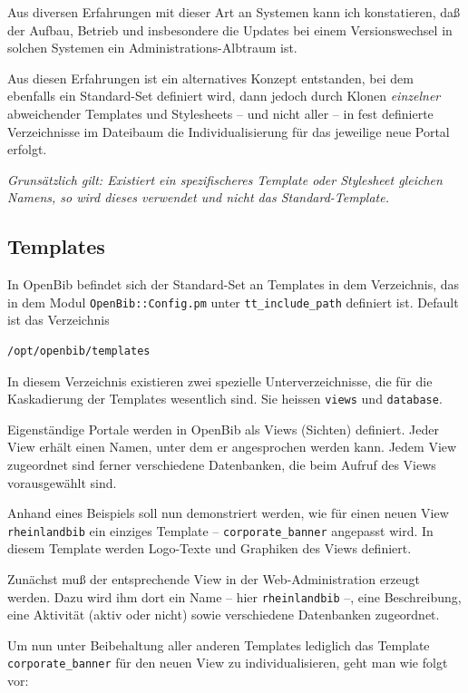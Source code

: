 \documentclass[11pt, twoside, a4paper, BCOR8mm, DIV12, bibtotoc,idxtotoc]{scrbook}
\begin{document}
Aus diversen Erfahrungen mit dieser Art an Systemen kann ich
konstatieren, daß der Aufbau, Betrieb und insbesondere die Updates bei
einem Versionswechsel in solchen Systemen ein Adminis\-tra\-tions-Albtraum
ist.

Aus diesen Erfahrungen ist ein alternatives Konzept entstanden, bei
dem ebenfalls ein Standard-Set definiert wird, dann jedoch durch Klonen
\emph{einzelner} abweichender Templates und Stylesheets -- und nicht
aller -- in fest definierte Verzeichnisse im Dateibaum die
Individualisierung für das jeweilige neue Portal erfolgt.

\emph{Grunsätzlich gilt: Existiert ein spezifischeres Template oder
Stylesheet gleichen Namens, so wird dieses verwendet und nicht das
Standard-Template.}


\subsection{Templates}

In OpenBib befindet sich der Standard-Set an Templates in dem
Verzeichnis, das in dem Modul \texttt{OpenBib::Config.pm} unter
\texttt{tt\_include\_path} definiert ist. Default ist das Verzeichnis
\begin{verbatim}
/opt/openbib/templates
\end{verbatim} 

In diesem Verzeichnis existieren zwei
spezielle Unterverzeichnisse, die für die Kaskadierung der Templates
wesentlich sind. Sie heissen \texttt{views} und \texttt{database}.

Eigenständige Portale werden in OpenBib als Views (Sichten)
definiert. Jeder View erhält einen Namen, unter dem er angesprochen
werden kann. Jedem View zugeordnet sind ferner verschiedene
Datenbanken, die beim Aufruf des Views vorausgewählt sind.

Anhand eines Beispiels soll nun demonstriert werden, wie für einen
neuen View \texttt{rheinlandbib} ein einziges Template --
\texttt{corporate\_banner} angepasst wird. In diesem Template werden
Logo-Texte und Graphiken des Views definiert.

Zunächst muß der entsprechende View in der Web-Administration erzeugt
werden. Dazu wird ihm dort ein Name -- hier \texttt{rheinlandbib} --,
eine Beschreibung, eine Aktivität (aktiv oder nicht) sowie
verschiedene Datenbanken zugeordnet.

Um nun unter Beibehaltung aller anderen Templates lediglich das
Template \texttt{corporate\_banner} für den neuen View zu
individualisieren, geht man wie folgt vor:
\end{document}
